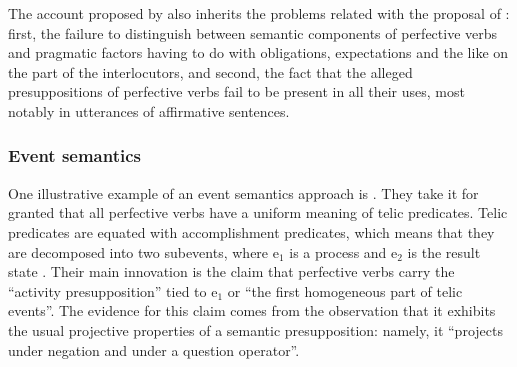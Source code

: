 The account proposed by \citet{Romanova:06} also inherits the problems related with the proposal of \citet{Paducheva:96}: first, the failure to distinguish between semantic components of perfective verbs  and pragmatic factors having to do with obligations, expectations and the like on the part of the interlocutors, and second, the fact that the alleged presuppositions of perfective verbs  fail to be present in all their uses, most notably in utterances of affirmative sentences. 

\subsubsection{Event semantics}
One illustrative example of an event semantics approach is \citet{Docekal:09}. They take it for granted that all perfective verbs  have a uniform meaning of telic predicates. Telic predicates are equated with accomplishment predicates, which means that they are decomposed into two subevents, where e$_1$ is a process and e$_2$ is the result state \citep[mainly following][]{Giorgi:01}. Their main innovation is the claim that perfective verbs  carry the ``activity presupposition'' tied to e$_1$ or ``the first homogeneous part of telic events''. The evidence for this claim comes from the observation that it exhibits the usual projective properties of a semantic presupposition: namely, it ``projects under negation and under a question operator''.

